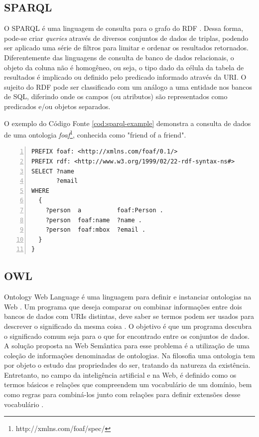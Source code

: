\subsection{SPARQL}

O SPARQL é uma linguagem de consulta para o grafo do RDF \citep{SparqlW3C}. Dessa forma, pode-se criar \textit{queries} através de diversos conjuntos de dados de triplas, podendo ser aplicado uma série de filtros para limitar e ordenar os resultados retornados. Diferentemente das linguagens de consulta de banco de dados relacionais, o objeto da coluna não é homogêneo, ou seja, o tipo dado da célula da tabela de resultados é implicado ou definido pelo predicado informado através da URI. O sujeito do RDF pode ser classificado com um análogo a uma entidade nos bancos de \ac{SQL}, diferindo onde os campos (ou atributos) são representados como predicados e/ou objetos separados.

O exemplo do Código Fonte \ref{cod:sparql-example} demonstra a consulta de dados de uma ontologia \textit{foaf}\footnote{http://xmlns.com/foaf/spec/}, conhecida como "friend of a friend".

\begin{lstlisting}[caption=Exemplo de consulta na linguagem SPARQL, language=SPARQL, frame=single, label={cod:sparql-example}, float, numbers=left]
PREFIX foaf: <http://xmlns.com/foaf/0.1/>
PREFIX rdf: <http://www.w3.org/1999/02/22-rdf-syntax-ns#>
SELECT ?name 
       ?email
WHERE
  {
    ?person  a          foaf:Person .
    ?person  foaf:name  ?name .
    ?person  foaf:mbox  ?email .
  }
}
\end{lstlisting}

\subsection{OWL}

Ontology Web Language é uma linguagem para definir e instanciar ontologias na Web \citep{OWLW3C}. Um programa que deseja comparar ou combinar informações entre dois bancos de dados com URIs distintas, deve saber se termos podem ser usados para descrever o significado da mesma coisa \citep{bernerslee2001semantic}. O objetivo é que um programa descubra o significado comum seja para o que for encontrado entre os conjuntos de dados. A solução proposta na Web Semântica para esse problema é a utilização de uma coleção de informações denominadas de ontologias. Na filosofia uma ontologia tem por objeto o estudo das propriedades do ser, tratando da natureza da existência. Entretanto, no campo da inteligência artificial e na Web, é definido como os termos básicos e relações que compreendem um vocabulário de um domínio, bem como regras para combiná-los junto com relações para definir extensões desse vocabulário \citep{Patil:1992:DKS:3087223.3087302}.

